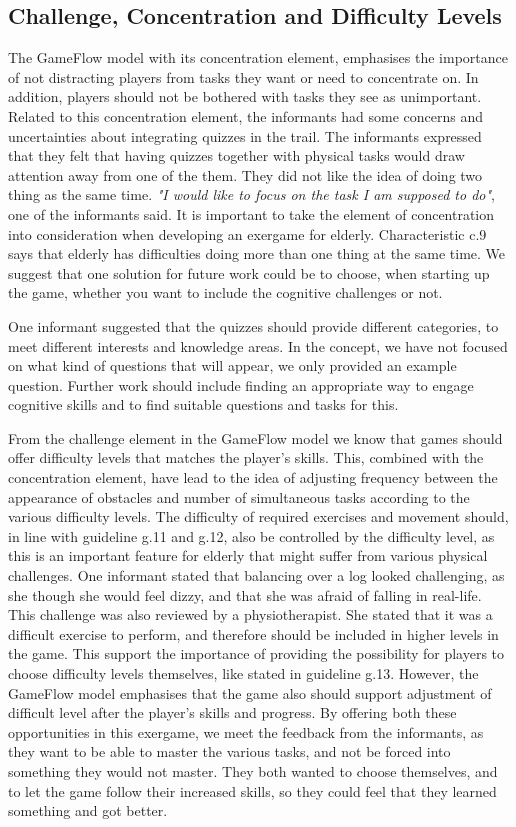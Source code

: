 \subsection{Challenge, Concentration and Difficulty Levels}

The GameFlow model with its concentration element, emphasises the importance of not distracting players from tasks they want or need to concentrate on. In addition, players should not be bothered with tasks they see as unimportant. Related to this concentration element, the informants had some concerns and uncertainties about integrating quizzes in the trail. The informants expressed that they felt that having quizzes together with physical tasks would draw attention away from one of the them. They did not like the idea of doing two thing as the same time. \emph{"I would like to focus on the task I am supposed to do"}, one of the informants said. It is important to take the element of concentration into consideration when developing an exergame for elderly. Characteristic c.9 says that elderly has difficulties doing more than one thing at the same time. We suggest that one solution for future work could be to choose, when starting up the game, whether you want to include the cognitive challenges or not. 

One informant suggested that the quizzes should provide different categories, to meet different interests and knowledge areas. In the concept, we have not focused on what kind of questions that will appear, we only provided an example question. Further work should include finding an appropriate way to engage cognitive skills and to find suitable questions and tasks for this.

From the challenge element in the GameFlow model we know that games should offer difficulty levels that matches the player's skills. This, combined with the concentration element, have lead to the idea of adjusting frequency between the appearance of obstacles and number of simultaneous tasks according to the various difficulty levels. The difficulty of required exercises and movement should, in line with guideline g.11 and g.12, also be controlled by the difficulty level, as this is an important feature for elderly that might suffer from various physical challenges. One informant stated that balancing over a log looked challenging, as she though she would feel dizzy, and that she was afraid of falling in real-life. This challenge was also reviewed by a physiotherapist. She stated that it was a difficult exercise to perform, and therefore should be included in higher levels in the game. This support the importance of providing the possibility for players to choose difficulty levels themselves, like stated in guideline g.13. However, the GameFlow model emphasises that the game also should support adjustment of difficult level after the player's skills and progress. By offering both these opportunities in this exergame, we meet the feedback from the informants, as they want to be able to master the various tasks, and not be forced into something they would not master. They both wanted to choose themselves, and to let the game follow their increased skills, so they could feel that they learned something and got better.  

